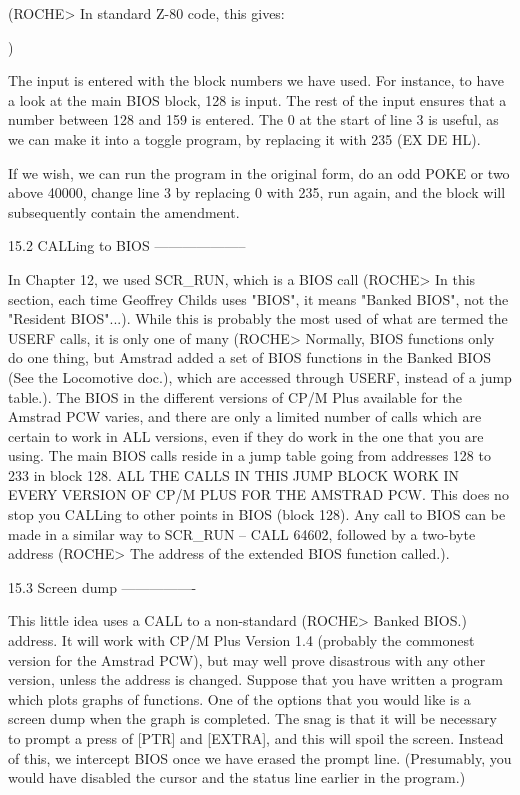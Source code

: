 (ROCHE> In standard Z-80 code, this gives:

$$$$
)

The  input  is entered with the block numbers we have used. For  instance,  to 
have  a  look  at the main BIOS block, 128 is input. The  rest  of  the  input 
ensures  that a number between 128 and 159 is entered. The 0 at the  start  of 
line  3  is useful, as we can make it into a toggle program, by  replacing  it 
with 235 (EX DE HL).

If we wish, we can run the program in the original form, do an odd POKE or two 
above  40000, change line 3 by replacing 0 with 235, run again, and the  block 
will subsequently contain the amendment.


15.2 CALLing to BIOS
--------------------

In Chapter 12, we used SCR_RUN, which is a BIOS call (ROCHE> In this  section, 
each  time  Geoffrey  Childs  uses "BIOS", it means  "Banked  BIOS",  not  the 
"Resident  BIOS"...). While this is probably the most used of what are  termed 
the USERF calls, it is only one of many (ROCHE> Normally, BIOS functions  only 
do  one  thing, but Amstrad added a set of BIOS functions in the  Banked  BIOS 
(See the Locomotive doc.), which are accessed through USERF, instead of a jump 
table.).  The  BIOS in the different versions of CP/M Plus available  for  the 
Amstrad  PCW  varies, and there are only a limited number of calls  which  are 
certain to work in ALL versions, even if they do work in the one that you  are 
using. The main BIOS calls reside in a jump table going from addresses 128  to 
233  in block 128. ALL THE CALLS IN THIS JUMP BLOCK WORK IN EVERY  VERSION  OF 
CP/M  PLUS FOR THE AMSTRAD PCW. This does no stop you CALLing to other  points 
in BIOS (block 128). Any call to BIOS can be made in a similar way to  SCR_RUN 
--  CALL  64602,  followed by a two-byte address (ROCHE> The  address  of  the 
extended BIOS function called.).


15.3 Screen dump
----------------

This little idea uses a CALL to a non-standard (ROCHE> Banked BIOS.)  address. 
It  will work with CP/M Plus Version 1.4 (probably the commonest  version  for 
the Amstrad PCW), but may well prove disastrous with any other version, unless 
the  address is changed. Suppose that you have written a program  which  plots 
graphs  of functions. One of the options that you would like is a screen  dump 
when the graph is completed. The snag is that it will be necessary to prompt a 
press  of [PTR] and [EXTRA], and this will spoil the screen. Instead of  this, 
we intercept BIOS once we have erased the prompt line. (Presumably, you  would 
have disabled the cursor and the status line earlier in the program.)


